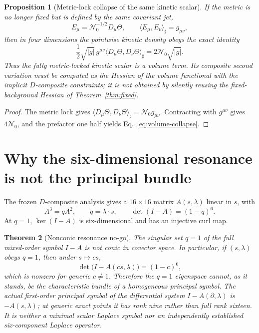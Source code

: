 \documentclass[11pt,a4paper]{article}
\newtheorem{theorem}{Theorem}
\newtheorem{proposition}[theorem]{Proposition}
\begin{document}
\begin{proposition}[Metric-lock collapse of the same kinetic scalar]
\label{prop:lock}
If the metric is no longer fixed but is defined by the same covariant jet,
\[
 E_\mu=\mathcal N_0^{-1/2}D_\mu\Theta,
 \qquad
 \langle E_\mu,E_\nu\rangle_\sharp=g_{\mu\nu},
\]
then in four dimensions the pointwise kinetic density obeys the exact identity
\begin{equation}
 \frac12\sqrt{|g|}\,g^{\mu\nu}
 \langle D_\mu\Theta,D_\nu\Theta\rangle_\sharp
 =2\mathcal N_0\sqrt{|g|}.
 \label{eq:volume-collapse}
\end{equation}
Thus the fully metric-locked kinetic scalar is a volume term.  Its composite
second variation must be computed as the Hessian of the volume functional
with the implicit $D$-composite constraints; it is not obtained by silently
reusing the fixed-background Hessian of Theorem~\ref{thm:fixed}.
\end{proposition}

\begin{proof}
The metric lock gives
$\langle D_\mu\Theta,D_\nu\Theta\rangle_\sharp
=\mathcal N_0g_{\mu\nu}$.  Contracting with $g^{\mu\nu}$ gives
$4\mathcal N_0$, and the prefactor one half yields
Eq.~\eqref{eq:volume-collapse}.
\end{proof}

\section{Why the six-dimensional resonance is not the principal bundle}
The frozen $D$-composite analysis gives a $16\times16$ matrix
$A(s,\lambda)$ linear in $s$, with
\begin{equation}
 A^3=qA^2,\qquad q=\lambda\cdot s,\qquad
 \det(I-A)=(1-q)^6.
 \label{eq:dcomp}
\end{equation}
At $q=1$, $\ker(I-A)$ is six-dimensional and has an injective curl map.

\begin{theorem}[Nonconic resonance no-go]
\label{thm:nonconic}
The singular set $q=1$ of the full mixed-order symbol $I-A$ is not conic in
covector space.  In particular, if $(s,\lambda)$ obeys $q=1$, then under
$s\mapsto cs$,
\begin{equation}
 \det\bigl(I-A(cs,\lambda)\bigr)=(1-c)^6,
\end{equation}
which is nonzero for generic $c\ne1$.  Therefore the $q=1$ eigenspace cannot,
as it stands, be the characteristic bundle of a homogeneous principal symbol.
The actual first-order principal symbol of the differential system
$I-A(\partial,\lambda)$ is $-A(s,\lambda)$; at generic exact points it has
rank nine rather than full rank sixteen.  It is neither a minimal scalar
Laplace symbol nor an independently established six-component Laplace
operator.
\end{theorem}
\end{document}
